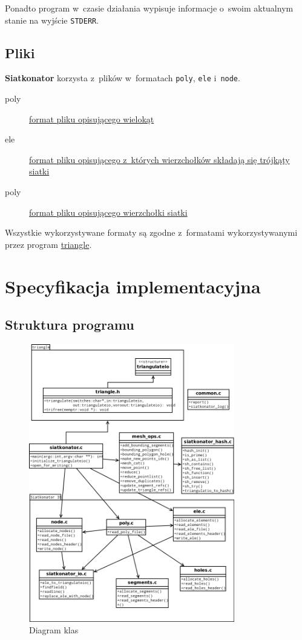 \documentclass[a4paper]{article} \usepackage{setspace}
\newcommand{\siatkonator}{\textbf{Siatkonator} }
\renewcommand{\triangle}{\href{http://www.cs.cmu.edu/~quake/triangle.html}{triangle}}
\begin{document}
Ponadto program w~czasie działania wypisuje informacje o~swoim aktualnym stanie na wyjście \texttt{STDERR}.

\subsection{Pliki}
\siatkonator korzysta z~plików w~formatach \texttt{poly}, \texttt{ele} i~\texttt{node}.

\begin{description}
  \item[poly] \href{http://www.cs.cmu.edu/~quake/triangle.poly.html}{format pliku opisującego wielokąt}
  \item[ele] \href{http://www.cs.cmu.edu/~quake/triangle.ele.html}{format pliku opisującego z~których wierzchołków składają się trójkąty siatki}
  \item[poly] \href{http://www.cs.cmu.edu/~quake/triangle.poly.html}{format pliku opisującego wierzchołki siatki}
\end{description}

Wszystkie wykorzystywane formaty są zgodne z~formatami wykorzystywanymi przez program \triangle.

\newpage
\section{Specyfikacja implementacyjna}
\subsection{Struktura programu}

\begin{figure}[h]
  \centering
  \includegraphics[width=0.8\textwidth]{class.png}
  \caption{Diagram klas}
\end{figure}
\end{document}
